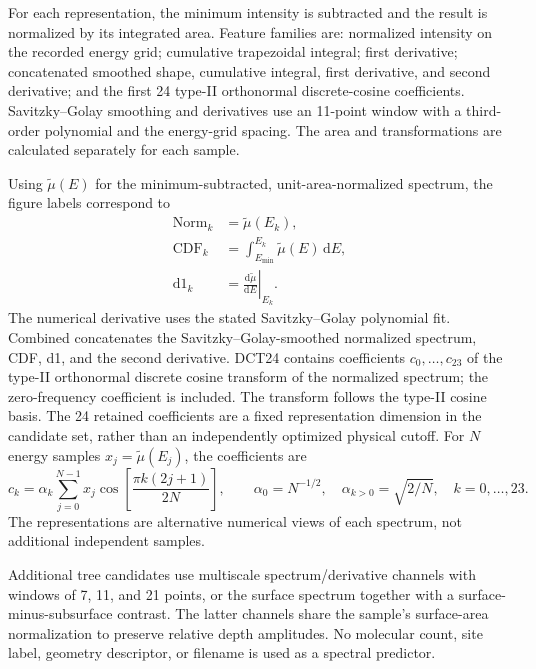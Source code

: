 \documentclass[11pt,a4paper]{article}
\begin{document}
For each representation, the minimum intensity is subtracted and the result is normalized by its integrated area. Feature families are: normalized intensity on the recorded energy grid; cumulative trapezoidal integral; first derivative; concatenated smoothed shape, cumulative integral, first derivative, and second derivative; and the first 24 type-II orthonormal discrete-cosine coefficients. Savitzky--Golay smoothing and derivatives use an 11-point window with a third-order polynomial and the energy-grid spacing. The area and transformations are calculated separately for each sample.

Using $\widetilde\mu(E)$ for the minimum-subtracted, unit-area-normalized spectrum, the figure labels correspond to
\begin{align}
\mathrm{Norm}_k &= \widetilde\mu(E_k),\\
\mathrm{CDF}_k &= \int_{E_{\min}}^{E_k}\widetilde\mu(E)\,\mathrm dE,\\
\mathrm{d1}_k &= \left.\frac{\mathrm d\widetilde\mu}{\mathrm dE}\right|_{E_k}.
\end{align}
The numerical derivative uses the stated Savitzky--Golay polynomial fit. Combined concatenates the Savitzky--Golay-smoothed normalized spectrum, CDF, d1, and the second derivative. DCT24 contains coefficients $c_0,\ldots,c_{23}$ of the type-II orthonormal discrete cosine transform of the normalized spectrum; the zero-frequency coefficient is included. The transform follows the type-II cosine basis.\cite{ahmed1974} The 24 retained coefficients are a fixed representation dimension in the candidate set, rather than an independently optimized physical cutoff. For $N$ energy samples $x_j=\widetilde\mu(E_j)$, the coefficients are \begin{equation}
c_k=\alpha_k\sum_{j=0}^{N-1}x_j\cos\!\left[\frac{\pi k(2j+1)}{2N}\right],\qquad
\alpha_0=N^{-1/2},\quad \alpha_{k>0}=\sqrt{2/N},\quad k=0,\ldots,23.
\end{equation}
The representations are alternative numerical views of each spectrum, not additional independent samples.


Additional tree candidates use multiscale spectrum/derivative channels with windows of 7, 11, and 21 points, or the surface spectrum together with a surface-minus-subsurface contrast. The latter channels share the sample's surface-area normalization to preserve relative depth amplitudes. No molecular count, site label, geometry descriptor, or filename is used as a spectral predictor.
\end{document}

